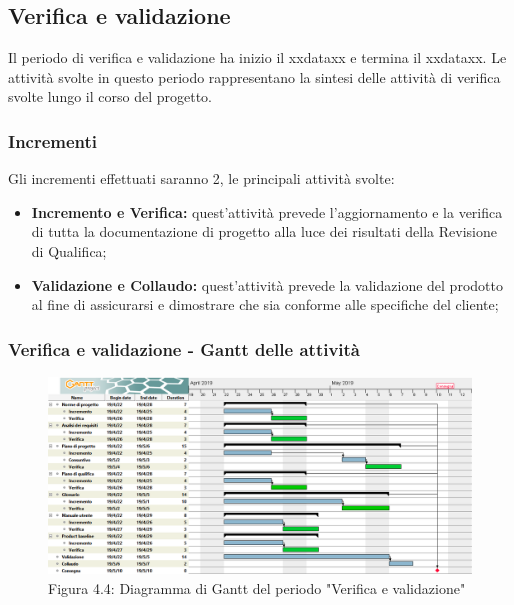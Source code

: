 \subsection{Verifica e validazione}
Il periodo di verifica e validazione ha inizio il xxdataxx e termina il xxdataxx.
Le attività svolte in questo periodo rappresentano la sintesi delle attività di verifica svolte lungo il corso del progetto.

\subsubsection{Incrementi}
Gli incrementi effettuati saranno 2, le principali attività svolte:
\begin{itemize}

	\item \textbf{Incremento e Verifica:} quest'attività prevede l'aggiornamento e la verifica di tutta la documentazione di progetto alla luce dei risultati della Revisione di Qualifica;

	\item \textbf{Validazione e Collaudo:} quest'attività prevede la validazione del prodotto al fine di assicurarsi e dimostrare che sia conforme alle specifiche del cliente;

\end{itemize}
 
 \subsubsection{Verifica e validazione - Gantt delle attività}

\begin{figure} [H]
	\centering
	\includegraphics[scale=0.35]{Res/Gantt/Validazione}
	\caption{Figura 4.4: Diagramma di Gantt del periodo "Verifica e validazione"}\label{}
\end{figure}

 
\pagebreak
